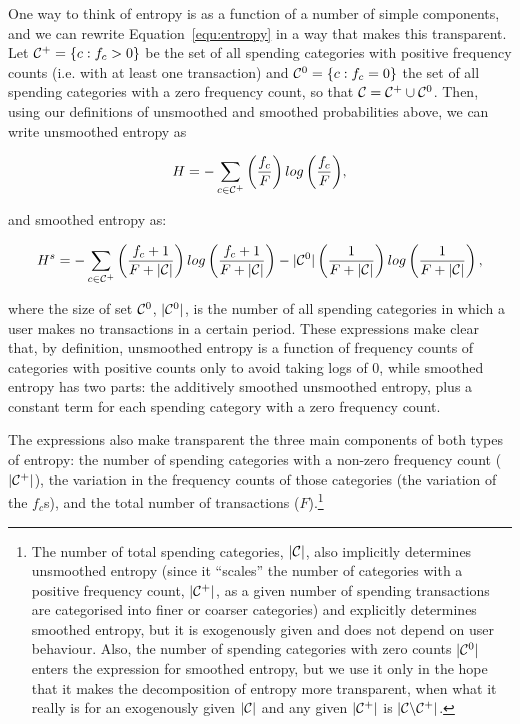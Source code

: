 One way to think of entropy is as a function of a number of simple components,
and we can rewrite Equation~\ref{equ:entropy} in a way that makes this
transparent. Let $\mathcal{C}^{+} = \{c: f_c > 0\}$ be the set of all spending
categories with positive frequency counts (i.e.  with at least one transaction)
and $\mathcal{C}^{0} = \{c: f_c = 0\}$ the set of all spending categories with a zero
frequency count, so that $\mathcal{C} = \mathcal{C}^{+} \cup \mathcal{C}^{0}$. Then, using our
definitions of unsmoothed and smoothed probabilities above, we can write
unsmoothed entropy as

\begin{equation}
\label{equ:entropy_us}
H = -\sum_{c \in \mathcal{C}^{+}}{\left(\frac{f_c}{F}\right)
log\left(\frac{f_c}{F}\right)},
\end{equation}

and smoothed entropy as:

\begin{equation}
\label{equ:entropy_s}
H^s = -\sum_{c \in \mathcal{C}^{+}}{\left(\frac{f_c + 1}{F + |\mathcal{C}|}\right)
log\left(\frac{f_c + 1}{F + |\mathcal{C}|}\right)}
- |\mathcal{C}^{0}|\left(\frac{1}{F + |\mathcal{C}|}\right)
log\left(\frac{1}{F + |\mathcal{C}|}\right),
\end{equation}

\noindent where the size of set $\mathcal{C}^{0}$, $|\mathcal{C}^{0}|$, is the number of all
spending categories in which a user makes no transactions in a certain period.
These expressions make clear that, by definition, unsmoothed entropy is a
function of frequency counts of categories with positive counts only to avoid
taking logs of 0, while smoothed entropy has two parts: the additively smoothed
unsmoothed entropy, plus a constant term for each spending category with a zero
frequency count.

The expressions also make transparent the three main components of both types
of entropy: the number of spending categories with a non-zero frequency count
($|\mathcal{C}^{+}|$), the variation in the frequency counts of those categories (the
variation of the $f_c$s), and the total number of transactions
($F$).\footnote{The number of total spending categories, $|\mathcal{C}|$, also
    implicitly determines unsmoothed entropy (since it ``scales'' the number of
    categories with a positive frequency count, $|\mathcal{C}^{+}|$, as a given number
    of spending transactions are categorised into finer or coarser categories)
    and explicitly determines smoothed entropy, but it is exogenously given and
    does not depend on user behaviour. Also, the number of spending categories
    with zero counts $|\mathcal{C}^{0}|$ enters the expression for smoothed entropy, but
    we use it only in the hope that it makes the decomposition of entropy more
    transparent, when what it really is for an exogenously given $|\mathcal{C}|$ and
any given $|\mathcal{C}^{+}|$ is $|\mathcal{C} \backslash \mathcal{C}^{+}|$.}

